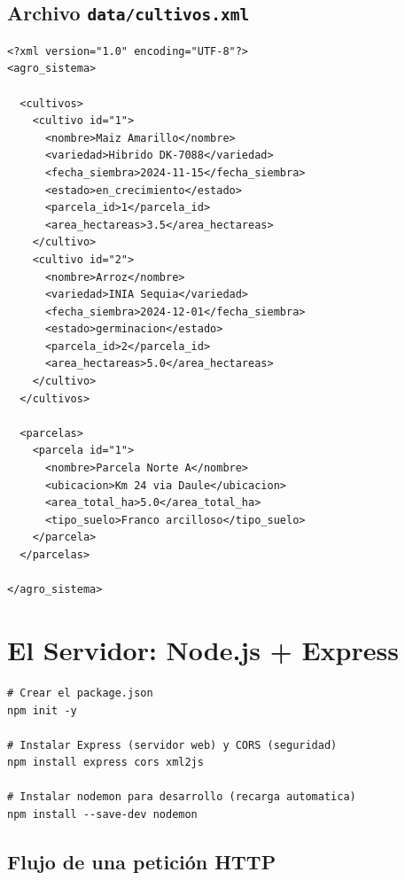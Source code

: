 \documentclass[12pt, a4paper]{article}
\begin{document}
\subsection{Archivo \texttt{data/cultivos.xml}}

\begin{tcolorbox}[codigoBox]
\begin{lstlisting}[style=xmlStyle, language={}]
<?xml version="1.0" encoding="UTF-8"?>
<agro_sistema>

  <cultivos>
    <cultivo id="1">
      <nombre>Maiz Amarillo</nombre>
      <variedad>Hibrido DK-7088</variedad>
      <fecha_siembra>2024-11-15</fecha_siembra>
      <estado>en_crecimiento</estado>
      <parcela_id>1</parcela_id>
      <area_hectareas>3.5</area_hectareas>
    </cultivo>
    <cultivo id="2">
      <nombre>Arroz</nombre>
      <variedad>INIA Sequia</variedad>
      <fecha_siembra>2024-12-01</fecha_siembra>
      <estado>germinacion</estado>
      <parcela_id>2</parcela_id>
      <area_hectareas>5.0</area_hectareas>
    </cultivo>
  </cultivos>

  <parcelas>
    <parcela id="1">
      <nombre>Parcela Norte A</nombre>
      <ubicacion>Km 24 via Daule</ubicacion>
      <area_total_ha>5.0</area_total_ha>
      <tipo_suelo>Franco arcilloso</tipo_suelo>
    </parcela>
  </parcelas>

</agro_sistema>
\end{lstlisting}
\end{tcolorbox}

\section{El Servidor: Node.js + Express}

\begin{tcolorbox}[pasoStyle, title={\faNpm\ Paso 2: Instalar dependencias}]
\begin{lstlisting}[style=bashStyle]
# Crear el package.json
npm init -y

# Instalar Express (servidor web) y CORS (seguridad)
npm install express cors xml2js

# Instalar nodemon para desarrollo (recarga automatica)
npm install --save-dev nodemon
\end{lstlisting}
\end{tcolorbox}

\subsection{Flujo de una petición HTTP}
\end{document}
